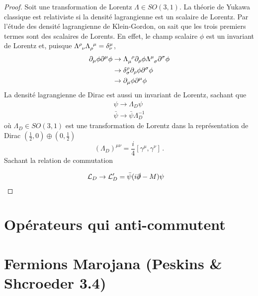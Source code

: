\documentclass{article}
\numberwithin{equation}{section}
\theoremstyle{solution}
\begin{document}
\begin{proof}
Soit une transformation de Lorentz $\Lambda \in SO(3, 1)$. La théorie de Yukawa classique est relativiste si 
la densité lagrangienne est un scalaire de Lorentz. Par l'étude des densité lagrangienne de Klein-Gordon,  
on sait que les trois premiers termes sont des scalaires de Lorents. En effet, le champ scalaire $\phi$ est un invariant de Lorentz 
et, puisque $\Lambda\indices{^{\rho}_{\nu}}\Lambda\indices{_{\rho}^{\mu}} = \delta^{\mu}_\nu$, 
\begin{align*}
       \partial_\mu \phi \partial^{\mu}\phi &\rightarrow \Lambda\indices{_{\mu}^{\rho}}\partial_\rho \phi \Lambda\indices{^{\mu}_{\sigma}}\partial^{\sigma}\phi \\
                &\rightarrow  \delta^{\rho}_\sigma \partial_\rho \phi\partial^{\sigma}\phi \\
                &\rightarrow  \partial_\mu \phi \partial^{\mu}\phi  \\
\end{align*} 
La densité lagrangienne de Dirac est aussi un invariant de Lorentz, sachant que 
\begin{equation}
        \begin{split}
                \psi \rightarrow \Lambda_D \psi \\
                \bar{\psi} \rightarrow \bar{\psi}\Lambda_D^{-1}
        \end{split}
\end{equation} 
où $\Lambda_D \in SO(3, 1)$ est une transformation de Lorentz dans la représentation de Dirac $(\frac{1}{2}, 0) \oplus (0, \frac{1}{2})$
\begin{equation}
        (\Lambda_D)^{\mu \nu} = \frac{i}{4}[\gamma^{\mu}, \gamma^{\nu}]\, .
\end{equation} 
Sachant la relation de commutation 
\begin{equation}
        [\gamma]
\end{equation} 

\begin{align*}
       \mathcal{L}_D \rightarrow \mathcal{L}'_D &= \bar{\psi}(i \slashed{\partial} - M) \psi
\end{align*}
\end{proof}
\section{Opérateurs qui anti-commutent}

\section{Fermions Marojana (Peskins \& Shcroeder 3.4)}
\end{document}
